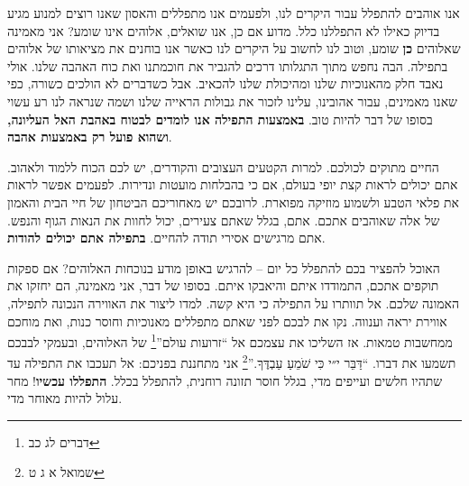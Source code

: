 \documentclass[12pt, extrafontsizes, twopage, a5paper]{memoir}
\begin{document}
אנו אוהבים להתפלל עבור היקרים לנו, ולפעמים אנו מתפללים והאסון שאנו רוצים למנוע מגיע בדיוק כאילו לא התפללנו כלל. מדוע אם כן, אנו שואלים, אלוהים אינו שומע? אני מאמינה שאלוהים \textbf {כן} שומע, וטוב לנו לחשוב על היקרים לנו כאשר אנו בוחנים את מציאותו של אלוהים בתפילה. הבה נחפש מתוך התגלותו דרכים להגביר את חוכמתנו ואת כוח האהבה שלנו. אולי נאבד חלק מהאנוכיות שלנו ומהיכולת שלנו להכאיב. אבל כשדברים לא הולכים כשורה, כפי שאנו מאמינים, עבור אהובינו, עלינו לזכור את גבולות הראייה שלנו ושמה שנראה לנו רע עשוי בסופו של דבר להיות טוב. \textbf{באמצעות התפילה אנו לומדים לבטוח באהבת האל העליונה, ושהוא פועל רק באמצעות אהבה}.

החיים מתוקים לכולכם. למרות הקטעים העצובים והקודרים, יש לכם הכוח ללמוד ולאהוב. אתם יכולים לראות קצת יופי בעולם, אם כי בהבלחות מועטות ונדירות. לפעמים אפשר לראות את פלאי הטבע ולשמוע מוזיקה מפוארת. לרובכם יש מאחוריכם הביטחון של חיי הבית והאמון של אלה שאוהבים אתכם. אתם, בגלל שאתם צעירים, יכול לחוות את הנאות הגוף והנפש. אתם מרגישים אסירי תודה להחיים. \textbf{בתפילה אתם יכולים להודות}.

האוכל להפציר בכם להתפלל כל יום -- להרגיש באופן מודע בנוכחות האלוהים? אם ספקות תוקפים אתכם, התמודדו איתם והיאבקו איתם. בסופו של דבר, אני מאמינה, הם יחזקו את האמונה שלכם. אל תוותרו על התפילה כי היא קשה. למדו ליצור את האווירה הנכונה לתפילה, אווירת יראה וענווה. נקו את לבכם לפני שאתם מתפללים מאנוכיות וחוסר כנות, ואת מוחכם ממחשבות טמאות. אז השליכו את עצמכם אל ``זרועות עולם''\footnote{דברים לג כב} של האלוהים, ובעמקי לבבכם תשמעו את דברו. ``דַּבֵּר י״י כִּי שֹׁמֵעַ עַבְדֶּךָ.''\footnote{שמואל א ג ט} אני מתחננת בפניכם: אל תעכבו את התפילה עד שתהיו חלשים ועייפים מדי, בגלל חוסר תזונה רוחנית, להתפלל בכלל. \textbf{התפללו עכשיו}! מחר עלול להיות מאוחר מדי.
\end{document}

